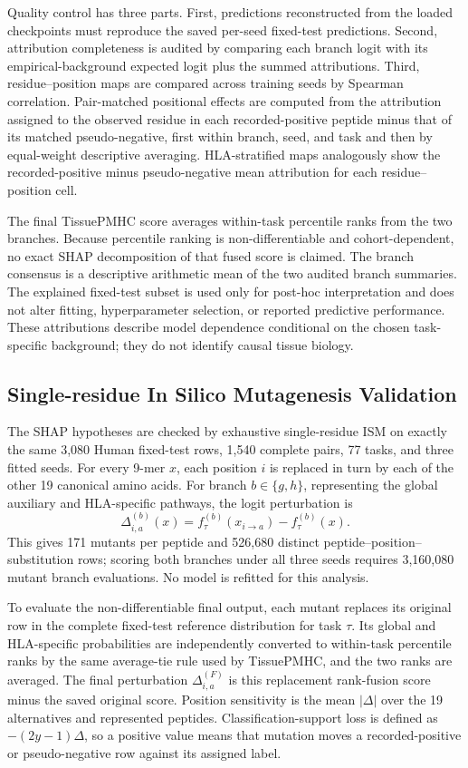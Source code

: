 Quality control has three parts. First, predictions reconstructed from the loaded checkpoints must reproduce the saved per-seed fixed-test predictions. Second, attribution completeness is audited by comparing each branch logit with its empirical-background expected logit plus the summed attributions. Third, residue--position maps are compared across training seeds by Spearman correlation. Pair-matched positional effects are computed from the attribution assigned to the observed residue in each recorded-positive peptide minus that of its matched pseudo-negative, first within branch, seed, and task and then by equal-weight descriptive averaging. HLA-stratified maps analogously show the recorded-positive minus pseudo-negative mean attribution for each residue--position cell.

The final TissuePMHC score averages within-task percentile ranks from the two branches. Because percentile ranking is non-differentiable and cohort-dependent, no exact SHAP decomposition of that fused score is claimed. The branch consensus is a descriptive arithmetic mean of the two audited branch summaries. The explained fixed-test subset is used only for post-hoc interpretation and does not alter fitting, hyperparameter selection, or reported predictive performance. These attributions describe model dependence conditional on the chosen task-specific background; they do not identify causal tissue biology.

\subsection{Single-residue In Silico Mutagenesis Validation}

The SHAP hypotheses are checked by exhaustive single-residue ISM on exactly the same 3,080 Human fixed-test rows, 1,540 complete pairs, 77 tasks, and three fitted seeds. For every 9-mer \(x\), each position \(i\) is replaced in turn by each of the other 19 canonical amino acids. For branch \(b\in\{g,h\}\), representing the global auxiliary and HLA-specific pathways, the logit perturbation is
\[
\Delta^{(b)}_{i,a}(x)=f^{(b)}_{\tau}(x_{i\rightarrow a})-f^{(b)}_{\tau}(x).
\]
This gives 171 mutants per peptide and 526,680 distinct peptide--position--substitution rows; scoring both branches under all three seeds requires 3,160,080 mutant branch evaluations. No model is refitted for this analysis.

To evaluate the non-differentiable final output, each mutant replaces its original row in the complete fixed-test reference distribution for task \(\tau\). Its global and HLA-specific probabilities are independently converted to within-task percentile ranks by the same average-tie rule used by TissuePMHC, and the two ranks are averaged. The final perturbation \(\Delta^{(F)}_{i,a}\) is this replacement rank-fusion score minus the saved original score. Position sensitivity is the mean \(\lvert\Delta\rvert\) over the 19 alternatives and represented peptides. Classification-support loss is defined as \(-(2y-1)\Delta\), so a positive value means that mutation moves a recorded-positive or pseudo-negative row against its assigned label.

